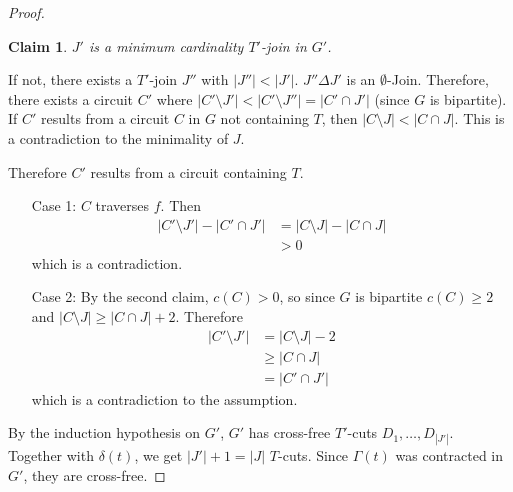 \documentclass[11pt, a4paper]{article}
\newcommand{\abs}[1]{\left\lvert#1\right\rvert}
\newtheorem*{claim}{Claim}
\theoremstyle{remark}
\theoremstyle{definition}
\begin{document}
\begin{proof}
	\begin{claim}
		$J'$ is a minimum cardinality $T'$-join in $G'$.
	\end{claim}
	If not, there exists a $T'$-join $J''$ with $\abs{J''}<\abs{J'}$.
	$J''\Delta J'$ is an $\emptyset$-Join. Therefore, there exists a circuit
	$C'$ where $\abs{C'\setminus J'}<\abs{C'\setminus J''}=\abs{C'\cap J'}$ (since
	$G$ is bipartite). If $C'$ results from a circuit $C$ in $G$ not containing
	$T$, then $\abs{C\setminus J}<\abs{C\cap J}$. This is a contradiction
	to the minimality of $J$.

	Therefore $C'$ results from a circuit containing $T$.
	\begin{enumerate}
		\item[Case 1:] $C$ traverses $f$. Then
		\begin{align*}
			\abs{C'\setminus J'}-\abs{C'\cap J'} & =\abs{C\setminus J}-\abs{C\cap J} \\
			                                     & >0
		\end{align*}
		which is a contradiction.

		\item[Case 2:] By the second claim, $c(C)>0$, so since $G$ is bipartite
		$c(C)\geq2$ and $\abs{C\setminus J}\geq \abs{C\cap J}+2$. Therefore
		\begin{align*}
			\abs{C'\setminus J'} & =\abs{C\setminus J}-2 \\
			                     & \geq \abs{C\cap J}    \\
			                     & =\abs{C'\cap J'}
		\end{align*}
		which is a contradiction to the assumption.
	\end{enumerate}

	By the induction hypothesis on $G'$, $G'$ has cross-free $T'$-cuts
	$D_1,\ldots,D_{\abs{J'}}$. Together with $\delta(t)$, we get
	$\abs{J'}+1=\abs{J}$ $T$-cuts. Since $\Gamma(t)$ was contracted in
	$G'$, they are cross-free.
\end{proof}

\end{document}
